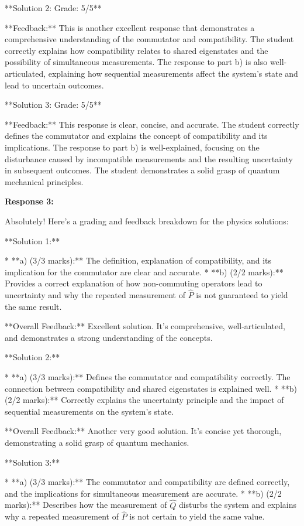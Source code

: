 \documentclass[a4paper,11pt]{article}
\begin{document}
**Solution 2: Grade: 5/5**

**Feedback:** This is another excellent response that demonstrates a comprehensive understanding of the commutator and compatibility. The student correctly explains how compatibility relates to shared eigenstates and the possibility of simultaneous measurements. The response to part b) is also well-articulated, explaining how sequential measurements affect the system's state and lead to uncertain outcomes.

**Solution 3: Grade: 5/5**

**Feedback:** This response is clear, concise, and accurate. The student correctly defines the commutator and explains the concept of compatibility and its implications. The response to part b) is well-explained, focusing on the disturbance caused by incompatible measurements and the resulting uncertainty in subsequent outcomes. The student demonstrates a solid grasp of quantum mechanical principles.

\bigskip    
\textbf{Response 3:}

Absolutely! Here's a grading and feedback breakdown for the physics solutions:

**Solution 1:**

* **a) (3/3 marks):**  The definition, explanation of compatibility, and its implication for the commutator are clear and accurate.
* **b) (2/2 marks):**  Provides a correct explanation of how non-commuting operators lead to uncertainty and why the repeated measurement of  \(\hat{P}\) is not guaranteed to yield the same result. 

**Overall Feedback:**  Excellent solution. It's comprehensive, well-articulated, and demonstrates a strong understanding of the concepts.

**Solution 2:**

* **a) (3/3 marks):**  Defines the commutator and compatibility correctly. The connection between compatibility and shared eigenstates is explained well.
* **b) (2/2 marks):** Correctly explains the uncertainty principle and the impact of sequential measurements on the system's state.

**Overall Feedback:** Another very good solution. It's concise yet thorough, demonstrating a solid grasp of quantum mechanics.

**Solution 3:**

* **a) (3/3 marks):** The commutator and compatibility are defined correctly, and the implications for simultaneous measurement are accurate.
* **b) (2/2 marks):**  Describes how the measurement of \(\hat{Q}\) disturbs the system and explains why a repeated measurement of \(\hat{P}\) is not certain to yield the same value.
\end{document}
